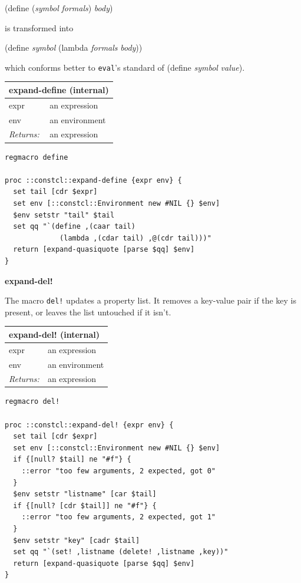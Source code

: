 \documentclass[twoside,9pt]{report}
\begin{document}
(define (\emph{symbol} \emph{formals}) \emph{body})


is transformed into


(define \emph{symbol} (lambda \emph{formals} \emph{body}))


which conforms better to \texttt{eval}'s standard of (define \emph{symbol} \emph{value}).

\begin{tabular}{ |l l| }
\hline
\multicolumn{2}{|l|}{expand-define (internal)} \\
\hline
expr & an expression \\
env & an environment \\
\textit{Returns:} & an expression \\
\hline
\end{tabular}

\noindent\makebox[\linewidth]{\rule{\linewidth}{0.4pt}}
\begin{lstlisting}
regmacro define
 
proc ::constcl::expand-define {expr env} {
  set tail [cdr $expr]
  set env [::constcl::Environment new #NIL {} $env]
  $env setstr "tail" $tail
  set qq "`(define ,(caar tail)
             (lambda ,(cdar tail) ,@(cdr tail)))"
  return [expand-quasiquote [parse $qq] $env]
}
\end{lstlisting}
\noindent\makebox[\linewidth]{\rule{\linewidth}{0.4pt}}

\textbf{expand-del!}


The macro \texttt{del!} updates a property list. It removes a key-value pair if the key is present, or leaves the list untouched if it isn't.

\begin{tabular}{ |l l| }
\hline
\multicolumn{2}{|l|}{expand-del! (internal)} \\
\hline
expr & an expression \\
env & an environment \\
\textit{Returns:} & an expression \\
\hline
\end{tabular}

\noindent\makebox[\linewidth]{\rule{\linewidth}{0.4pt}}
\begin{lstlisting}
regmacro del!
 
proc ::constcl::expand-del! {expr env} {
  set tail [cdr $expr]
  set env [::constcl::Environment new #NIL {} $env]
  if {[null? $tail] ne "#f"} {
    ::error "too few arguments, 2 expected, got 0"
  }
  $env setstr "listname" [car $tail]
  if {[null? [cdr $tail]] ne "#f"} {
    ::error "too few arguments, 2 expected, got 1"
  }
  $env setstr "key" [cadr $tail]
  set qq "`(set! ,listname (delete! ,listname ,key))"
  return [expand-quasiquote [parse $qq] $env]
}
\end{lstlisting}
\noindent\makebox[\linewidth]{\rule{\linewidth}{0.4pt}}
\end{document}
